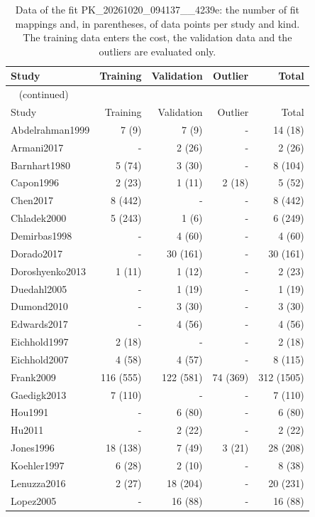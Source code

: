 \documentclass{article}
\begin{document}
\begin{longtable}{lrrrr}
\caption{Data of the fit PK\_20261020\_094137\_\_4239e: the number of fit mappings and, in parentheses, of data points per study and kind. The training data enters the cost, the validation data and the outliers are evaluated only.}\label{tab:data:PK_20261020_094137__4239e} \\
\toprule
Study & Training & Validation & Outlier & Total \\
\midrule
\endfirsthead
\multicolumn{5}{l}{\small\tablename~\thetable{} (continued)} \\
\toprule
Study & Training & Validation & Outlier & Total \\
\midrule
\endhead
\bottomrule
\endlastfoot
Abdelrahman1999 & 7 (9) & 7 (9) & - & 14 (18) \\
Armani2017 & - & 2 (26) & - & 2 (26) \\
Barnhart1980 & 5 (74) & 3 (30) & - & 8 (104) \\
Capon1996 & 2 (23) & 1 (11) & 2 (18) & 5 (52) \\
Chen2017 & 8 (442) & - & - & 8 (442) \\
Chladek2000 & 5 (243) & 1 (6) & - & 6 (249) \\
Demirbas1998 & - & 4 (60) & - & 4 (60) \\
Dorado2017 & - & 30 (161) & - & 30 (161) \\
Doroshyenko2013 & 1 (11) & 1 (12) & - & 2 (23) \\
Duedahl2005 & - & 1 (19) & - & 1 (19) \\
Dumond2010 & - & 3 (30) & - & 3 (30) \\
Edwards2017 & - & 4 (56) & - & 4 (56) \\
Eichhold1997 & 2 (18) & - & - & 2 (18) \\
Eichhold2007 & 4 (58) & 4 (57) & - & 8 (115) \\
Frank2009 & 116 (555) & 122 (581) & 74 (369) & 312 (1505) \\
Gaedigk2013 & 7 (110) & - & - & 7 (110) \\
Hou1991 & - & 6 (80) & - & 6 (80) \\
Hu2011 & - & 2 (22) & - & 2 (22) \\
Jones1996 & 18 (138) & 7 (49) & 3 (21) & 28 (208) \\
Koehler1997 & 6 (28) & 2 (10) & - & 8 (38) \\
Lenuzza2016 & 2 (27) & 18 (204) & - & 20 (231) \\
Lopez2005 & - & 16 (88) & - & 16 (88) \\

\end{longtable}
\end{document}

